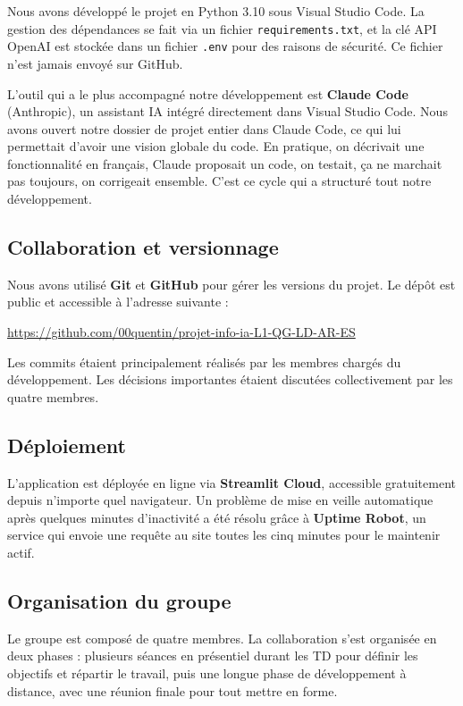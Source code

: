 \documentclass[a4paper, 12pt, twoside]{article}
\begin{document}
Nous avons développé le projet en Python 3.10 sous Visual Studio Code. La gestion
des dépendances se fait via un fichier \texttt{requirements.txt}, et la clé API
OpenAI est stockée dans un fichier \texttt{.env} pour des raisons de sécurité.
Ce fichier n'est jamais envoyé sur GitHub.

L'outil qui a le plus accompagné notre développement est \textbf{Claude Code}
(Anthropic), un assistant IA intégré directement dans Visual Studio Code. Nous avons
ouvert notre dossier de projet entier dans Claude Code, ce qui lui permettait d'avoir
une vision globale du code. En pratique, on décrivait une fonctionnalité en français,
Claude proposait un code, on testait, ça ne marchait pas toujours, on corrigeait
ensemble. C'est ce cycle qui a structuré tout notre développement.

\subsection{Collaboration et versionnage}

Nous avons utilisé \textbf{Git} et \textbf{GitHub} pour gérer les versions du projet.
Le dépôt est public et accessible à l'adresse suivante :

\begin{center}
\url{https://github.com/00quentin/projet-info-ia-L1-QG-LD-AR-ES}
\end{center}

Les commits étaient principalement réalisés par les membres chargés du développement.
Les décisions importantes étaient discutées collectivement par les quatre membres.

\subsection{Déploiement}

L'application est déployée en ligne via \textbf{Streamlit Cloud}, accessible
gratuitement depuis n'importe quel navigateur. Un problème de mise en veille
automatique après quelques minutes d'inactivité a été résolu grâce à
\textbf{Uptime Robot}, un service qui envoie une requête au site toutes les cinq
minutes pour le maintenir actif.

\subsection{Organisation du groupe}

Le groupe est composé de quatre membres. La collaboration s'est organisée en deux
phases : plusieurs séances en présentiel durant les TD pour définir les objectifs et
répartir le travail, puis une longue phase de développement à distance, avec une
réunion finale pour tout mettre en forme.
\end{document}
